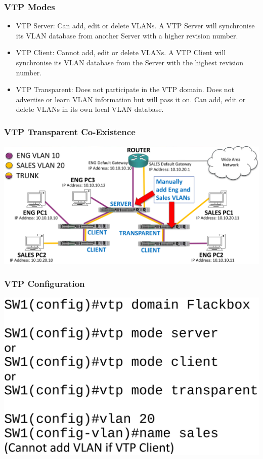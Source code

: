 \documentclass[pdflatex,compress,mathserif]{beamer}
\begin{document}
\begin{frame}
	\frametitle{VTP Modes}
	\begin{itemize}
		\item VTP Server: Can add, edit or delete VLANs. A VTP Server will
synchronise its VLAN database from another Server with a higher
revision number.
		\item VTP Client: Cannot add, edit or delete VLANs. A VTP Client will
synchronise its VLAN database from the Server with the highest
revision number.
		\item VTP Transparent: Does not participate in the VTP domain. Does not
advertise or learn VLAN information but will pass it on. Can add, edit
or delete VLANs in its own local VLAN database.
	\end{itemize}
\end{frame}

\begin{frame}
	\frametitle{VTP Transparent Co-Existence}
	\begin{center}
		\includegraphics[width=\linewidth]{img/img42}
	\end{center}
\end{frame}

\begin{frame}
	\frametitle{VTP Configuration}
	\begin{center}
		\includegraphics[width=0.7\linewidth]{img/img43}
	\end{center}
\end{frame}
\end{document}
